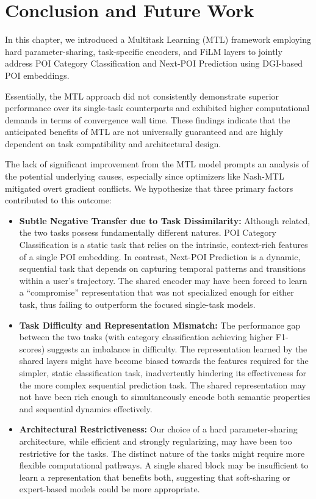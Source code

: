 \section{Conclusion and Future Work}
\label{sec:cbic:conclusion}

In this chapter, we introduced a Multitask Learning (MTL) framework employing hard parameter-sharing, task-specific encoders, and FiLM layers to jointly address POI Category Classification and Next-POI Prediction using DGI-based POI embeddings.

Essentially, the MTL approach did not consistently demonstrate superior performance over its single-task counterparts and exhibited higher computational demands in terms of convergence wall time. These findings indicate that the anticipated benefits of MTL are not universally guaranteed and are highly dependent on task compatibility and architectural design.

The lack of significant improvement from the MTL model prompts an analysis of the potential underlying causes, especially since optimizers like Nash-MTL mitigated overt gradient conflicts. We hypothesize that three primary factors contributed to this outcome:
\begin{itemize}
    \item \textbf{Subtle Negative Transfer due to Task Dissimilarity:} Although related, the two tasks possess fundamentally different natures. POI Category Classification is a static task that relies on the intrinsic, context-rich features of a single POI embedding. In contrast, Next-POI Prediction is a dynamic, sequential task that depends on capturing temporal patterns and transitions within a user's trajectory. The shared encoder may have been forced to learn a ``compromise'' representation that was not specialized enough for either task, thus failing to outperform the focused single-task models.
    \item \textbf{Task Difficulty and Representation Mismatch:} The performance gap between the two tasks (with category classification achieving higher F1-scores) suggests an imbalance in difficulty. The representation learned by the shared layers might have become biased towards the features required for the simpler, static classification task, inadvertently hindering its effectiveness for the more complex sequential prediction task. The shared representation may not have been rich enough to simultaneously encode both semantic properties and sequential dynamics effectively.
    \item \textbf{Architectural Restrictiveness:} Our choice of a hard parameter-sharing architecture, while efficient and strongly regularizing, may have been too restrictive for the tasks. The distinct nature of the tasks might require more flexible computational pathways. A single shared block may be insufficient to learn a representation that benefits both, suggesting that soft-sharing or expert-based models could be more appropriate.
\end{itemize}

